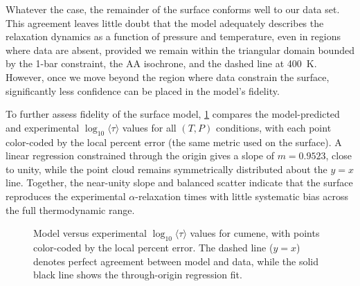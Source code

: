 Whatever the case, the remainder of the surface conforms well to our data set. This agreement leaves little doubt that the model adequately describes the relaxation dynamics as a function of pressure and temperature, even in regions where data are absent, provided we remain within the triangular domain bounded by the 1-bar constraint, the AA isochrone, and the dashed line at 400~K. However, once we move beyond the region where data constrain the surface, significantly less confidence can be placed in the model’s fidelity.  

To further assess fidelity of the surface model, \fig \ref{fig:CumeneModelVsExp} compares the model-predicted and experimental $\log_{10}\langle\tau\rangle$ values for all $(T,P)$ conditions, with each point color-coded by the local percent error (the same metric used on the surface). A linear regression constrained through the origin gives a slope of $m=0.9523$, close to unity, while the point cloud remains symmetrically distributed about the $y=x$ line. Together, the near-unity slope and balanced scatter indicate that the surface reproduces the experimental $\alpha$-relaxation times with little systematic bias across the full thermodynamic range.

\begin{figure}[!htbp]
	\centering
	\caption{Model versus experimental $\log_{10}\langle\tau\rangle$ values for cumene, with points color-coded by the local percent error. The dashed line ($y=x$) denotes perfect agreement between model and data, while the solid black line shows the through-origin regression fit.}
	\label{fig:CumeneModelVsExp}
\end{figure} 

